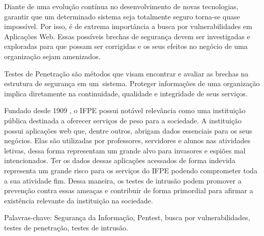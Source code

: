 \documentclass[
    12pt,               %
    openright,          %
    oneside,            %
    a4paper,            %
    section=TITLE,     %
    english,            %
    french,             %
    spanish,            %
    brazil              %
    ]{abntex2}
\newcommand{\citep}{\cite}
\begin{document}
\setlength{\absparsep}{18pt} %
\begin{resumo}
  
  
 Diante de uma evolução contínua no desenvolvimento de novas tecnologias, garantir que um determinado sistema seja totalmente seguro torna-se quase impossível. Por isso, é de extrema importância a busca por vulnerabilidades em Aplicações Web. Essas possíveis brechas de segurança devem ser investigadas e exploradas para que possam ser corrigidas e os seus efeitos no negócio de uma organização sejam amenizados.


Testes de Penetração são métodos que visam encontrar e avaliar as brechas na estrutura de segurança em um~sistema. Proteger informações de uma organização implica diretamente na continuidade, qualidade e integridade de seus serviços.


Fundado desde 1909 \citep{62952}, o IFPE possui notável relevância como uma instituição pública destinada a oferecer serviços de peso para a sociedade. A instituição possui aplicações web que, dentre outros, abrigam dados essenciais para os seus negócios. Elas são utilizadas por professores, servidores e alunos nas atividades letivas, dessa forma representam um grande alvo para invasores e espiões mal intencionados. Ter os dados dessas aplicações acessados de forma indevida representa um grande risco para os serviços do IFPE podendo comprometer toda a sua atividade fim. Dessa maneira, os testes de intrusão podem promover a prevenção contra essas ameaças e contribuir de forma primordial para afirmar a existência relevante da instituição na sociedade.




Palavras-chave: Segurança da Informação, Pentest, busca por vulnerabilidades, testes de penetração, testes de intrusão.


\end{resumo}



\end{document}
